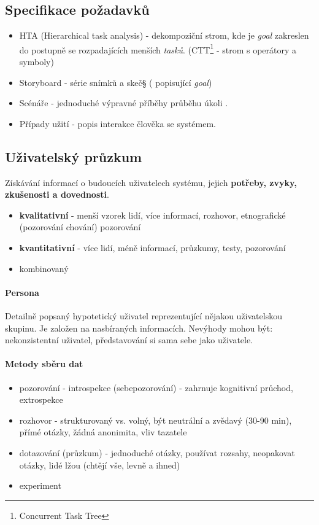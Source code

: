 \subsection{Specifikace požadavků}
\begin{itemize}[itemsep=0px]
\item HTA (Hierarchical task analysis) - dekompoziční strom, kde je \textit{goal} zakreslen do postupně se rozpadajících menších \textit{tasků}. (CTT\footnote{Concurrent Task Tree} - strom s operátory a symboly)
\item Storyboard - série snímků a skeč§ ( popisující \textit{goal})
\item Scénáře - jednoduché výpravné příběhy průběhu úkoli \textit{}.
\item Případy užití - popis interakce člověka se systémem.
\end{itemize}

\subsection{Uživatelský průzkum}
Získávání informací o budoucích uživatelech systému, jejich \textbf{potřeby, zvyky, zkušenosti a dovednosti}.

\begin{itemize}[itemsep=0px]
\item \textbf{kvalitativní} - menší vzorek lidí, více informací, rozhovor, etnografické (pozorování chování) pozorování
\item \textbf{kvantitativní} - více lidí, méně informací, průzkumy, testy, pozorování
\item kombinovaný
\end{itemize}

\paragraph{Persona}
Detailně popsaný hypotetický uživatel reprezentující nějakou uživatelskou skupinu. Je založen na nasbíraných informacích. Nevýhody mohou být: nekonzistentní uživatel, představování si sama sebe jako uživatele.

\paragraph{Metody sběru dat}
\begin{itemize}[itemsep=0px]
\item pozorování - introspekce (sebepozorování) - zahrnuje kognitivní průchod, extrospekce
\item rozhovor - strukturovaný vs. volný, být neutrální a zvědavý (30-90 min), přímé otázky, žádná anonimita, vliv tazatele
\item dotazování (průzkum) - jednoduché otázky, používat rozsahy, neopakovat otázky, lidé lžou (chtějí vše, levně a ihned)
\item experiment
\end{itemize}

